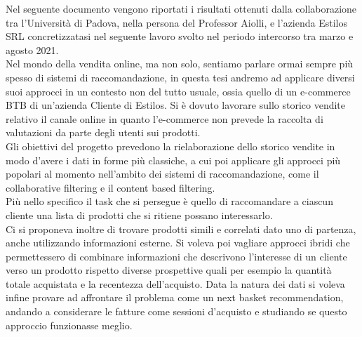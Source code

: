 
Nel seguente documento vengono riportati i risultati ottenuti dalla collaborazione tra l'Università di Padova, nella persona del Professor Aiolli, e l'azienda Estilos SRL concretizzatasi nel seguente lavoro svolto nel periodo intercorso tra marzo e agosto 2021.\\
Nel mondo della vendita online, ma non solo, sentiamo parlare ormai sempre più spesso di sistemi di raccomandazione, in questa tesi andremo ad applicare diversi suoi approcci in un contesto non del tutto usuale, ossia quello di un e-commerce BTB di un'azienda Cliente di Estilos. 
Si è dovuto lavorare sullo storico vendite relativo il canale online in quanto l'e-commerce non prevede la raccolta di valutazioni da parte degli utenti sui prodotti.\\
Gli obiettivi del progetto prevedono la rielaborazione dello storico vendite in modo d'avere i dati in forme più classiche, a cui poi applicare gli approcci più popolari al momento nell'ambito dei sistemi di raccomandazione, come il collaborative filtering e il content based filtering.\\
Più nello specifico il task che si persegue è quello di raccomandare a ciascun cliente una lista di prodotti che si ritiene possano interessarlo.\\
Ci si proponeva inoltre di trovare prodotti simili e correlati dato uno di partenza, anche utilizzando informazioni esterne. Si voleva poi vagliare approcci ibridi che permettessero di combinare informazioni che descrivono l'interesse di un cliente verso un prodotto rispetto diverse prospettive quali per esempio la quantità totale acquistata e la recentezza dell'acquisto. Data la natura dei dati si voleva infine provare ad affrontare il problema come un next basket recommendation, andando a considerare le fatture come sessioni d'acquisto e studiando se questo approccio funzionasse meglio.   






















